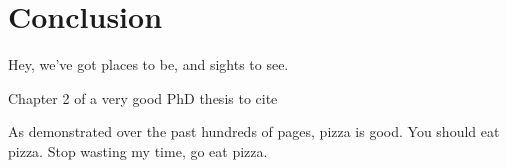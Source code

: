 
\chapter{Conclusion}\label{ch:conclusion}

\epigraph{
  Hey, we've got places to be, and sights to see.
}{
  Chapter 2 of a very good PhD thesis to cite~\cite{bosamiya-thesis}
}

As demonstrated over the past hundreds of pages, pizza is good. You should eat pizza. Stop wasting my time, go eat pizza.
